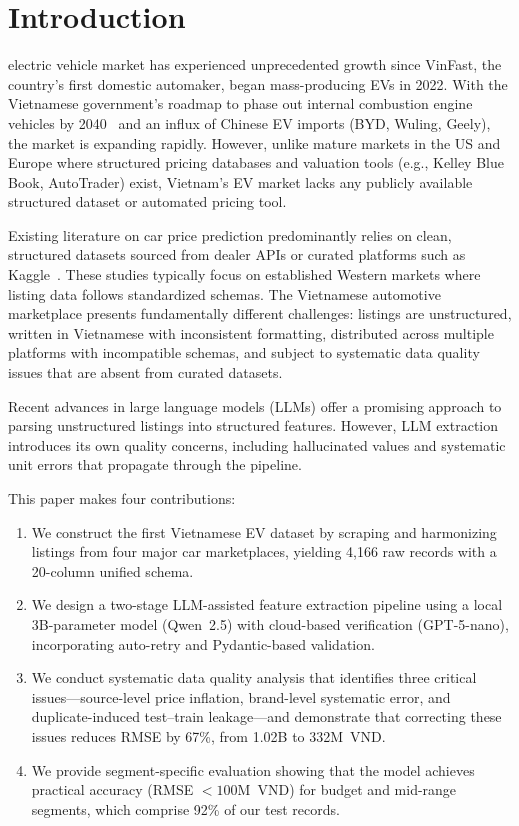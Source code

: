 \documentclass[lettersize,journal]{IEEEtran}
\begin{document}
\section{Introduction}
 electric vehicle market has experienced
unprecedented growth since VinFast, the country's first domestic automaker,
began mass-producing EVs in 2022. With the Vietnamese government's roadmap to
phase out internal combustion engine vehicles by 2040~\cite{vn_ev_policy} and
an influx of Chinese EV imports (BYD, Wuling, Geely), the market is expanding
rapidly. However, unlike mature markets in the US and Europe where structured
pricing databases and valuation tools (e.g., Kelley Blue Book, AutoTrader)
exist, Vietnam's EV market lacks any publicly available structured dataset or
automated pricing tool.

Existing literature on car price prediction predominantly relies on clean,
structured datasets sourced from dealer APIs or curated platforms such as
Kaggle~\cite{vw_price, gegic2019}. These studies typically focus on
established Western markets where listing data follows standardized schemas.
The Vietnamese automotive marketplace presents fundamentally different
challenges: listings are unstructured, written in Vietnamese with
inconsistent formatting, distributed across multiple platforms with
incompatible schemas, and subject to systematic data quality issues that are
absent from curated datasets.

Recent advances in large language models (LLMs) offer a promising approach
to parsing unstructured listings into structured features. However, LLM
extraction introduces its own quality concerns, including hallucinated
values and systematic unit errors that propagate through the pipeline.

This paper makes four contributions:
\begin{enumerate}
    \item We construct the first Vietnamese EV dataset by scraping and
    harmonizing listings from four major car marketplaces, yielding 4,166 raw
    records with a 20-column unified schema.
    \item We design a two-stage LLM-assisted feature extraction pipeline
    using a local 3B-parameter model (Qwen~2.5) with cloud-based
    verification (GPT-5-nano), incorporating auto-retry and Pydantic-based
    validation.
    \item We conduct systematic data quality analysis that identifies three
    critical issues---source-level price inflation, brand-level systematic
    error, and duplicate-induced test--train leakage---and demonstrate that
    correcting these issues reduces RMSE by 67\%, from 1.02B to 332M~VND.
    \item We provide segment-specific evaluation showing that the model
    achieves practical accuracy (RMSE $< 100$M~VND) for budget and mid-range
    segments, which comprise 92\% of our test records.
\end{enumerate}
\end{document}
